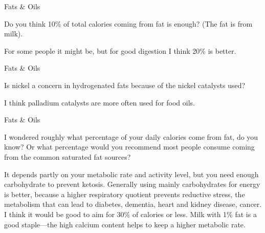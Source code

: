 \documentclass[11pt,oneside,openany,extrafontsizes]{memoir}
\begin{document}
\begin{qaexchange}{Fats \& Oils}

    \begin{question}
        Do you think 10\% of total calories coming from fat is enough? (The fat is from milk).
    \end{question}

    \begin{answer}
      For some people it might be, but for good digestion I think 20\% is better.
    \end{answer}
\end{qaexchange}

\begin{qaexchange}{Fats \& Oils}

    \begin{question}
      Is nickel a concern in hydrogenated fats because of the nickel catalysts used?
    \end{question}

    \begin{answer}
      I think palladium catalysts are more often used for food oils.
    \end{answer}
\end{qaexchange}

\begin{qaexchange}{Fats \& Oils}

    \begin{question}
         I wondered roughly what percentage of your daily calories come from fat, do you know? Or what percentage would you recommend most people consume coming from the common saturated fat sources?
    \end{question}

    \begin{answer}
      It depends partly on your metabolic rate and activity level, but you need enough carbohydrate to prevent ketosis. Generally using mainly carbohydrates for energy is better, because a higher respiratory quotient prevents reductive stress, the metabolism that can lead to diabetes, dementia, heart and kidney disease, cancer. I think it would be good to aim for 30\% of calories or less. Milk with 1\% fat is a good staple—the high calcium content helps to keep a higher metabolic rate.
    \end{answer}
\end{qaexchange}
\end{document}
